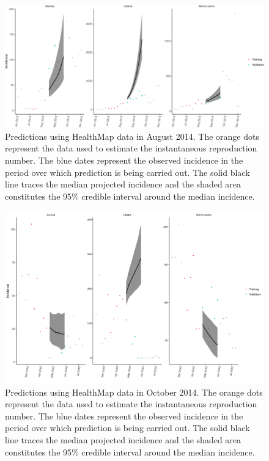 \documentclass[11pt,]{article}
\begin{document}
\begin{figure}
  \centering
  \includegraphics[]{ms6-figures/hm_summary_projections_0.99_1_150}
  \caption{Predictions using HealthMap data in August 2014. The
    orange dots represent the data used to estimate the instantaneous
    reproduction number. The blue dates represent the observed
    incidence in the period over which prediction is being carried
    out. The solid black line traces the median projected incidence
    and the shaded area constitutes the 95\% credible interval around
    the median incidence.}
  \label{fig:hm-prediction-200}
\end{figure}


\begin{figure}
  \centering
  \includegraphics[]{ms6-figures/hm_summary_projections_0.99_2_400}
  \caption{Predictions using HealthMap data in October 2014. The
    orange dots represent the data used to estimate the instantaneous
    reproduction number. The blue dates represent the observed
    incidence in the period over which prediction is being carried
    out. The solid black line traces the median projected incidence
    and the shaded area constitutes the 95\% credible interval around
    the median incidence.}
  \label{fig:hm-prediction-400}
\end{figure}
\FloatBarrier
\end{document}
